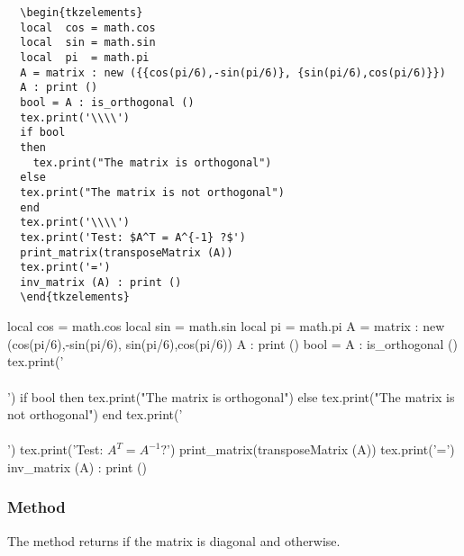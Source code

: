 \begin{Verbatim}
  \begin{tkzelements}
  local  cos = math.cos
  local  sin = math.sin
  local  pi  = math.pi
  A = matrix : new ({{cos(pi/6),-sin(pi/6)}, {sin(pi/6),cos(pi/6)}})
  A : print ()
  bool = A : is_orthogonal ()
  tex.print('\\\\')
  if bool 
  then
    tex.print("The matrix is orthogonal") 
  else 
  tex.print("The matrix is not orthogonal") 
  end
  tex.print('\\\\')
  tex.print('Test: $A^T = A^{-1} ?$')
  print_matrix(transposeMatrix (A))
  tex.print('=')
  inv_matrix (A) : print ()
  \end{tkzelements}
\end{Verbatim}

\begin{tkzelements}
local  cos = math.cos
local  sin = math.sin
local  pi  = math.pi
A = matrix : new ({{cos(pi/6),-sin(pi/6)}, {sin(pi/6),cos(pi/6)}})
A : print ()
bool = A : is_orthogonal ()
tex.print('\\\\')
if bool then tex.print("The matrix is orthogonal") else tex.print("The matrix is not orthogonal") end
tex.print('\\\\')
tex.print('Test: $A^T = A^{-1} ?$')
print_matrix(transposeMatrix (A))
tex.print('=')
inv_matrix (A) : print ()
\end{tkzelements}

\subsubsection{Method } %
\label{ssub:method_is_diagonal}

The method returns  if the matrix is diagonal and  otherwise.


